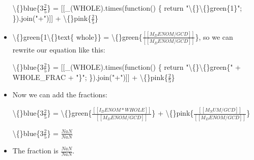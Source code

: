 \documentclass{article}
\begin{document}
\begin{itemize}
                            
                                \textbackslash\{\}blue\{3$\frac{2}{5}$\} = 
                                [[\_(WHOLE).times(function() \{ return "\textbackslash\{\}\textbackslash\{\}green\{1\}"; \}).join("+")]]
                                + \textbackslash\{\}pink\{$\frac{2}{5}$\}
  \item \textbackslash\{\}green\{1\textbackslash\{\}text\{ whole\}\} = \textbackslash\{\}green\{$\frac{[[M_DENOM / GCD]]}{[[M_DENOM / GCD]]}$\},
                                so we can rewrite our equation like this:
                            
                            
                                \textbackslash\{\}blue\{3$\frac{2}{5}$\} = 
                                [[\_(WHOLE).times(function() \{ return "\textbackslash\{\}\textbackslash\{\}green\{" + WHOLE\_FRAC + "\}"; \}).join("+")]]
                                + \textbackslash\{\}pink\{$\frac{2}{5}$\}
  \item Now we can add the fractions:
                            
                                \textbackslash\{\}blue\{3$\frac{2}{5}$\} = 
                                \textbackslash\{\}green\{$\frac{[[I_DENOM * WHOLE]]}{[[M_DENOM / GCD]]}$\} +
                                \textbackslash\{\}pink\{$\frac{[[M_NUM / GCD]]}{[[M_DENOM / GCD]]}$\}
                            
                            
                                \textbackslash\{\}blue\{3$\frac{2}{5}$\} = 
                                $\frac{NaN}{NaN}$
  \item The fraction is $\frac{NaN}{NaN}$.
\end{itemize}
\end{document}
